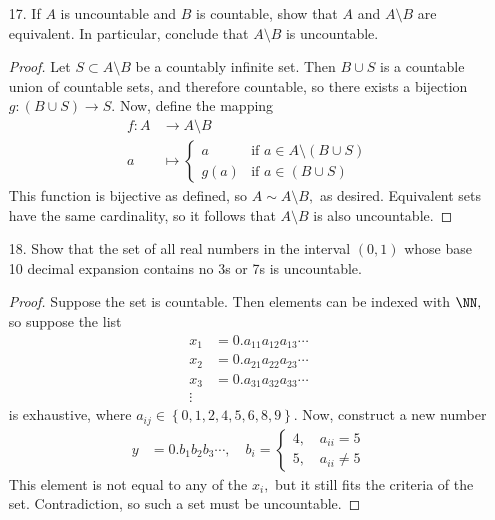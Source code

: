 \documentclass{article}
\begin{document}
\begin{itemize}
	\item[17.] If $A$ is uncountable and $B$ is countable, show that $A$ and $A\setminus B$ are equivalent. In particular, conclude that $A\setminus B$ is uncountable.
		\begin{proof}
			Let $S\subset A\setminus B$ be a countably infinite set. Then $B\cup S$ is a countable union of countable sets, and therefore countable, so there exists a bijection $g:(B\cup S)\to S.$ Now, define the mapping
			\begin{align*}
				f:A &\to A\setminus B \\
				a &\mapsto \begin{cases}
					a & \text{if } a\in A\setminus(B\cup S) \\
					g(a) & \text{if } a\in (B\cup S)
				\end{cases}
			\end{align*}
			This function is bijective as defined, so $A\sim A\setminus B,$ as desired. Equivalent sets have the same cardinality, so it follows that $A\setminus B$ is also uncountable.
		\end{proof}

		\newpage
	\item[18.] Show that the set of all real numbers in the interval $(0, 1)$ whose base 10 decimal expansion contains no 3s or 7s is uncountable.
		\begin{proof}
			Suppose the set is countable. Then elements can be indexed with $\NN,$ so suppose the list
			\begin{align*}
				x_1 &= 0.a_{11}a_{12}a_{13}\cdots \\
				x_2 &= 0.a_{21}a_{22}a_{23}\cdots \\
				x_3 &= 0.a_{31}a_{32}a_{33}\cdots \\
				\vdots
			\end{align*}
			is exhaustive, where $a_{ij}\in\left\{ 0, 1, 2, 4, 5, 6, 8, 9 \right\}.$ Now, construct a new number
			\begin{align*}
				y &= 0.b_1b_2b_3\cdots, \quad b_i = \begin{cases}
					4, \quad a_{ii} = 5 \\
					5, \quad a_{ii}\neq 5
				\end{cases}
			\end{align*}
			This element is not equal to any of the $x_i,$ but it still fits the criteria of the set. Contradiction, so such a set must be uncountable.
		\end{proof}
		
\end{itemize}
\end{document}
